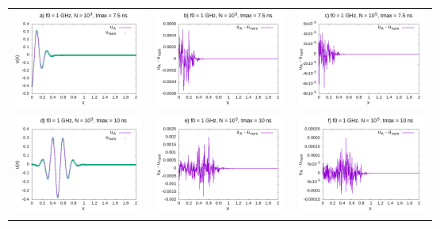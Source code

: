 \documentclass[11pt,a4paper]{report}
\begin{document}
\begin{figure}
\begin{tabular}{ccc}
  \includegraphics[width=55mm]{plots/1/mc1_3_075} &   \includegraphics[width=55mm]{plots/1/mc1_3_075_dif} &   \includegraphics[width=55mm]{plots/1/mc1_5_075_dif} \\
\includegraphics[width=55mm]{plots/1/mc1_3_10} &   \includegraphics[width=55mm]{plots/1/mc1_3_10_dif} &   \includegraphics[width=55mm]{plots/1/mc1_5_10_dif} \\

\end{tabular}
\end{figure}
\end{document}

